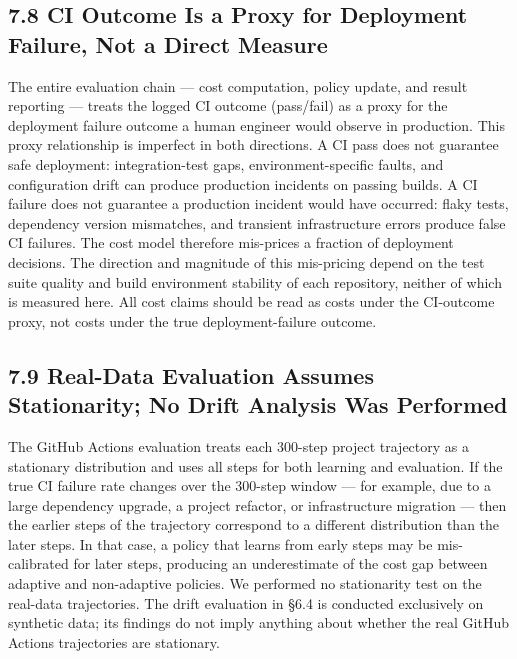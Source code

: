 \documentclass[10pt]{article}
\begin{document}
\subsection{7.8 CI Outcome Is a Proxy for Deployment Failure, Not a
Direct
Measure}\label{ci-outcome-is-a-proxy-for-deployment-failure-not-a-direct-measure}

The entire evaluation chain --- cost computation, policy update, and
result reporting --- treats the logged CI outcome (pass/fail) as a proxy
for the deployment failure outcome a human engineer would observe in
production. This proxy relationship is imperfect in both directions. A
CI pass does not guarantee safe deployment: integration-test gaps,
environment-specific faults, and configuration drift can produce
production incidents on passing builds. A CI failure does not guarantee
a production incident would have occurred: flaky tests, dependency
version mismatches, and transient infrastructure errors produce false CI
failures. The cost model therefore mis-prices a fraction of deployment
decisions. The direction and magnitude of this mis-pricing depend on the
test suite quality and build environment stability of each repository,
neither of which is measured here. All cost claims should be read as
costs under the CI-outcome proxy, not costs under the true
deployment-failure outcome.

\subsection{7.9 Real-Data Evaluation Assumes Stationarity; No Drift
Analysis Was
Performed}\label{real-data-evaluation-assumes-stationarity-no-drift-analysis-was-performed}

The GitHub Actions evaluation treats each 300-step project trajectory as
a stationary distribution and uses all steps for both learning and
evaluation. If the true CI failure rate changes over the 300-step window
--- for example, due to a large dependency upgrade, a project refactor,
or infrastructure migration --- then the earlier steps of the trajectory
correspond to a different distribution than the later steps. In that
case, a policy that learns from early steps may be mis-calibrated for
later steps, producing an underestimate of the cost gap between adaptive
and non-adaptive policies. We performed no stationarity test on the
real-data trajectories. The drift evaluation in §6.4 is conducted
exclusively on synthetic data; its findings do not imply anything about
whether the real GitHub Actions trajectories are stationary.
\end{document}
